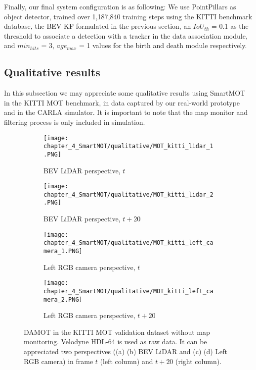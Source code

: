 Finally, our final system configuration is as following: We use PointPillars \cite{lang2019pointpillars} as object detector, trained over 1,187,840 training steps using the KITTI benchmark database, the \ac{BEV} \ac{KF} formulated in the previous section, an $IoU_{th}$ = 0.1 as the threshold to associate a detection with a tracker in the data association module, and $min_{hits}$ = 3, $age_{max}$ = 1 values for the birth and death module respectively. 

\subsection{Qualitative results}
\label{subsubsec:4_mot_quali_carla_campus}

In this subsection we may appreciate some qualitative results using SmartMOT in the KITTI \ac{MOT} benchmark, in data captured by our real-world prototype and in the \ac{CARLA} simulator. It is important to note that the map monitor and filtering process is only included in simulation. 

\begin{figure}[!h]
	\centering
	\begin{subfigure}{0.45\textwidth}
		\captionsetup{justification=centering}
		\texttt{[image: chapter\_4\_SmartMOT/qualitative/MOT\_kitti\_lidar\_1.PNG]}
		\caption{\ac{BEV} \ac{LiDAR} perspective, $t$}
	\end{subfigure}
	\hfill
	\begin{subfigure}{0.45\textwidth}
		\captionsetup{justification=centering}
		\texttt{[image: chapter\_4\_SmartMOT/qualitative/MOT\_kitti\_lidar\_2.PNG]}
		\caption{\ac{BEV} \ac{LiDAR} perspective, $t+20$}
	\end{subfigure}
	\hfill
	\begin{subfigure}{0.45\textwidth}
		\captionsetup{justification=centering}
		\texttt{[image: chapter\_4\_SmartMOT/qualitative/MOT\_kitti\_left\_camera\_1.PNG]}
		\caption{Left RGB camera perspective, $t$}
	\end{subfigure}
	\hfill
	\begin{subfigure}{0.45\textwidth}
		\captionsetup{justification=centering}
		\texttt{[image: chapter\_4\_SmartMOT/qualitative/MOT\_kitti\_left\_camera\_2.PNG]}
		\caption{Left RGB camera perspective, $t+20$}
	\end{subfigure}
	\captionsetup{justification=justified}
	\caption[\ac{DAMOT} in the KITTI \ac{MOT} validation dataset without map monitoring]{\ac{DAMOT} in the KITTI \ac{MOT} validation dataset without map monitoring. Velodyne HDL-64 is used as raw data. It can be appreciated two perspectives ((a) (b) \ac{BEV} \ac{LiDAR} and (c) (d) Left RGB camera) in frame $t$ (left column) and $t+20$ (right column).}
	\label{fig:chapter_4_SmartMOT/MOT_KITTI}
\end{figure}


